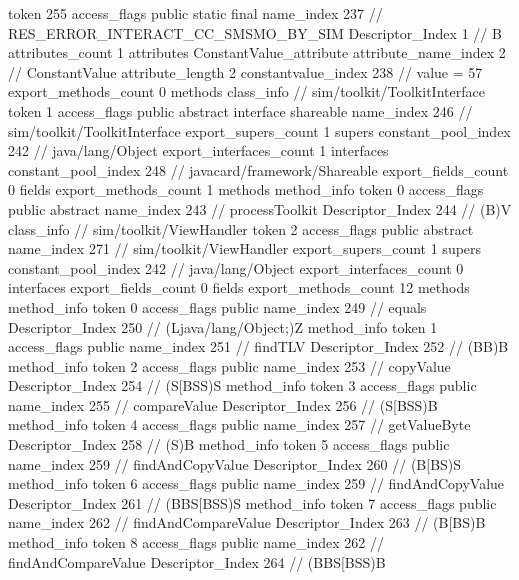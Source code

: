 {{{{{				token	255
				access_flags	public static final
				name_index	237		// RES_ERROR_INTERACT_CC_SMSMO_BY_SIM
				Descriptor_Index	1		// B
				attributes_count	1
				attributes {
				ConstantValue_attribute {
					attribute_name_index	2		// ConstantValue
					attribute_length	2
					constantvalue_index	238		// value = 57
				}
				}
			}
			}
			export_methods_count	0
			methods {
			}
		}
		class_info {		// sim/toolkit/ToolkitInterface
			token	1
			access_flags	public abstract interface shareable
			name_index	246		// sim/toolkit/ToolkitInterface
			export_supers_count	1
			supers {
				constant_pool_index	242		// java/lang/Object
			}
			export_interfaces_count	1
			interfaces {
				constant_pool_index	248		// javacard/framework/Shareable
			}
			export_fields_count	0
			fields {
			}
			export_methods_count	1
			methods {
				method_info {
					token	0
					access_flags	public abstract
					name_index	243		// processToolkit
					Descriptor_Index	244		// (B)V
				}
			}
		}
		class_info {		// sim/toolkit/ViewHandler
			token	2
			access_flags	public abstract
			name_index	271		// sim/toolkit/ViewHandler
			export_supers_count	1
			supers {
				constant_pool_index	242		// java/lang/Object
			}
			export_interfaces_count	0
			interfaces {
			}
			export_fields_count	0
			fields {
			}
			export_methods_count	12
			methods {
				method_info {
					token	0
					access_flags	public
					name_index	249		// equals
					Descriptor_Index	250		// (Ljava/lang/Object;)Z
				}
				method_info {
					token	1
					access_flags	public
					name_index	251		// findTLV
					Descriptor_Index	252		// (BB)B
				}
				method_info {
					token	2
					access_flags	public
					name_index	253		// copyValue
					Descriptor_Index	254		// (S[BSS)S
				}
				method_info {
					token	3
					access_flags	public
					name_index	255		// compareValue
					Descriptor_Index	256		// (S[BSS)B
				}
				method_info {
					token	4
					access_flags	public
					name_index	257		// getValueByte
					Descriptor_Index	258		// (S)B
				}
				method_info {
					token	5
					access_flags	public
					name_index	259		// findAndCopyValue
					Descriptor_Index	260		// (B[BS)S
				}
				method_info {
					token	6
					access_flags	public
					name_index	259		// findAndCopyValue
					Descriptor_Index	261		// (BBS[BSS)S
				}
				method_info {
					token	7
					access_flags	public
					name_index	262		// findAndCompareValue
					Descriptor_Index	263		// (B[BS)B
				}
				method_info {
					token	8
					access_flags	public
					name_index	262		// findAndCompareValue
					Descriptor_Index	264		// (BBS[BSS)B
				}
}}}}

